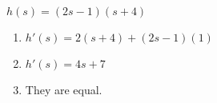 {$h(s) = (2s-1)(s+4)$
}
{\begin{enumerate}
\item		$h'(s) = 2(s+4) + (2s-1)(1)$
\item		$h'(s) = 4s + 7$
\item		They are equal.
\end{enumerate}
}
